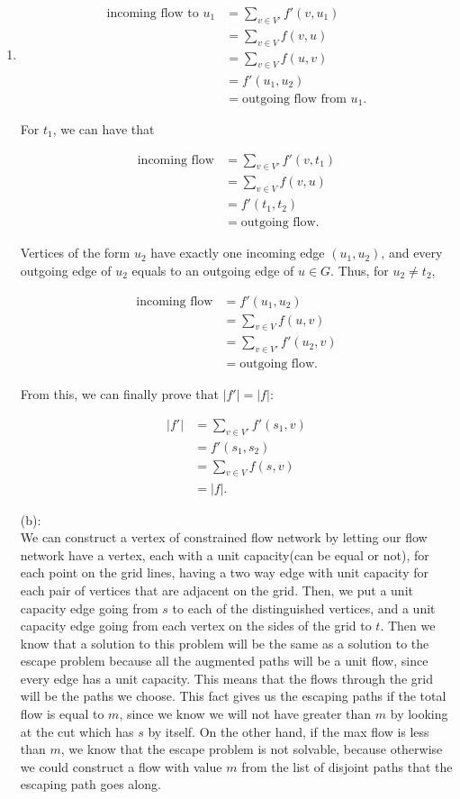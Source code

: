 \documentclass[12pt,a4paper]{article}
\makeatletter
\newtheorem*{solution}{Solution}
\theoremstyle{definition}
\renewenvironment{solution}[1][Solution] {\par\pushQED{\qed}\normalfont\topsep6\p@\@plus6\p@\relax\trivlist\item[\hskip\labelsep\bfseries#1\@addpunct{.}]\ignorespaces}{\popQED\endtrivlist\@endpefalse} \makeatother
\makeatother
\begin{document}
\begin{enumerate}
\begin{solution}
    $$ \begin{aligned} \text{incoming flow to $u_1$} & = \sum_{v \in V'} f'(v, u_1) \\ & = \sum_{v \in V} f(v, u) \\ & = \sum_{v \in V} f(u, v) \qquad \\ & = f'(u_1, u_2) \\ & = \text{outgoing flow from $u_1$}. \end{aligned} $$

    For $t_1$, we can have that

    $$ \begin{aligned} \text{incoming flow} & = \sum_{v \in V'} f'(v, t_1) \\ & = \sum_{v \in V} f(v, u) \\ & = f'(t_1, t_2) \\ & = \text{outgoing flow}. \end{aligned} $$

    Vertices of the form $u_2$ have exactly one incoming edge $(u_1, u_2)$, and every outgoing edge of $u_2$ equals to an outgoing edge of $u \in G$. Thus, for $u_2 \ne t_2$,

    $$ \begin{aligned} \text{incoming flow} & = f'(u_1, u_2) \\ & = \sum_{v \in V} f(u, v) \\ & = \sum_{v \in V'} f'(u_2, v) \\ & = \text{outgoing flow}. \end{aligned} $$

    From this, we can finally prove that $|f'| = |f|$:

    $$ \begin{aligned} |f'| & = \sum_{v \in V'} f'(s_1, v) \\ & = f'(s_1, s_2) \qquad  \\ & = \sum_{v \in V} f(s, v) \\ & = |f|. \end{aligned} $$
	
	(b):\\
	We can construct a vertex of constrained flow network by letting our flow network have a vertex, each with a unit capacity(can be equal or not), for each point on the grid lines, having a two way edge with unit capacity for each pair of vertices that are adjacent on  the grid. Then, we put a unit capacity edge going from $s$ to each of the distinguished vertices, and a unit capacity edge going from each vertex on the sides of the grid to $t$. Then we know that a solution to this problem will be the same as a solution to the escape problem because all the augmented paths will be a unit flow, since every edge has a unit capacity. This means that the flows through the grid will be the paths we choose. This fact gives us the escaping paths if the total flow is equal to $m$, since we know we will not have greater than $m$ by looking at the cut which has $s$ by itself. On the other hand, if the max flow is less than $m$, we know that the escape problem is not solvable, because otherwise we could construct a flow with value $m$ from the list of disjoint paths that the escaping path goes along.
	

\end{solution}
\end{enumerate}
\end{document}
